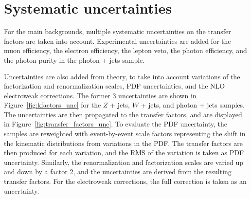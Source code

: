 \section{Systematic uncertainties}
\label{sec:syst}

For the main backgrounds, multiple systematic uncertainties on the transfer factors are taken into account. Experimental uncertainties are added for the muon efficiency, the electron efficiency, the lepton veto, the photon efficiency, and the photon purity in the photon + jets sample. 

Uncertainties are also added from theory, to take into account variations of the factorization and renormalization scales, PDF uncertainties, and the NLO electroweak corrections. The former 3 uncertainties are shown in Figure~\ref{fig:kfactors_unc} for the $Z$ + jets, $W$ + jets, and photon + jets samples. The  uncertainties are then propagated to the transfer factors, and are displayed in Figure~\ref{fig:transfer_factors_unc}. To evaluate the PDF uncertainty, the samples are reweighted with event-by-event scale factors representing the shift in the kinematic distributions from variations in the PDF. The transfer factors are then produced for each variation, and the RMS of the variation is taken as PDF uncertainty. Similarly, the renormalization and factorization scales are varied up and down by a factor 2, and the uncertainties are derived from the resulting transfer factors. For the electroweak corrections, the full correction is taken as an uncertainty.

